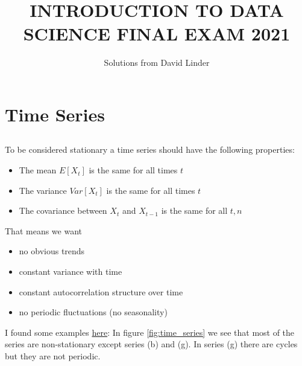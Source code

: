 \documentclass[]{article}
\title{\textbf{INTRODUCTION TO DATA SCIENCE FINAL EXAM 2021}}
\author{Solutions from David Linder}
\begin{document}
\maketitle
\thispagestyle{fancy}
\section{Time Series}
\subsection{}
To be considered stationary a time series should have the following properties:
\begin{itemize}
	\item The mean $E[X_t]$ is the same for all times $t$
	\item The variance $Var[X_t]$ is the same for all times $t$
	\item The covariance between $X_t$ and $X_{t-1}$ is the same for all $t, n$
\end{itemize}
That means we want
\begin{itemize}
	\item no obvious trends
	\item constant variance with time
	\item constant autocorrelation structure over time
	\item no periodic fluctuations (no seasonality)
\end{itemize}
I found some examples \href{https://otexts.com/fpp2/stationarity.html}{here}: In figure \ref{fig:time_series} we see that most of the series are non-stationary except series (b) and (g). In series (g) there are cycles but they are not periodic. 
\end{document}
